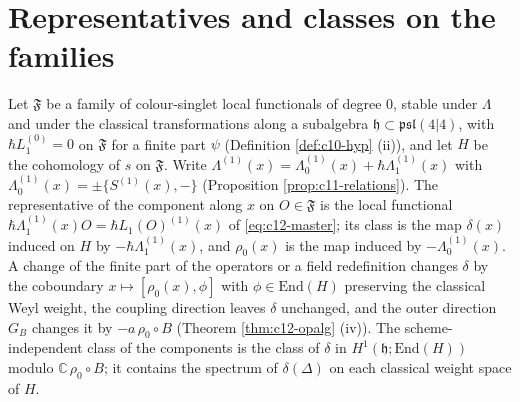 \section{Representatives and classes on the families}

\begin{definition}
\label{def:c12-class}
Let $\mathfrak F$ be a family of colour-singlet local functionals of degree $0$, stable under $\Lambda$ and under the classical transformations along a subalgebra $\mathfrak h\subset\mathfrak{psl}(4|4)$, with $\hbar L_1^{(0)}=0$ on $\mathfrak F$ for a finite part $\psi$ (Definition \ref{def:c10-hyp} (ii)), and let $H$ be the cohomology of $s$ on $\mathfrak F$. Write $\Lambda^{(1)}(x)=\Lambda^{(1)}_0(x)+\hbar\Lambda^{(1)}_1(x)$ with $\Lambda^{(1)}_0(x)=\pm\{S^{(1)}(x),-\}$ (Proposition \ref{prop:c11-relations}). The representative of the component along $x$ on $O\in\mathfrak F$ is the local functional $\hbar\Lambda^{(1)}_1(x)O=\hbar L_1(O)^{(1)}(x)$ of \eqref{eq:c12-master}; its class is the map $\delta(x)$ induced on $H$ by $-\hbar\Lambda^{(1)}_1(x)$, and $\rho_0(x)$ is the map induced by $-\Lambda^{(1)}_0(x)$. A change of the finite part of the operators or a field redefinition changes $\delta$ by the coboundary $x\mapsto[\rho_0(x),\phi]$ with $\phi\in\mathrm{End}(H)$ preserving the classical Weyl weight, the coupling direction leaves $\delta$ unchanged, and the outer direction $G_B$ changes it by $-a\,\rho_0\circ B$ (Theorem \ref{thm:c12-opalg} (iv)). The scheme-independent class of the components is the class of $\delta$ in $H^1(\mathfrak h;\mathrm{End}(H))$ modulo $\mathbb C\,\rho_0\circ B$; it contains the spectrum of $\delta(\Delta)$ on each classical weight space of $H$.
\end{definition}

